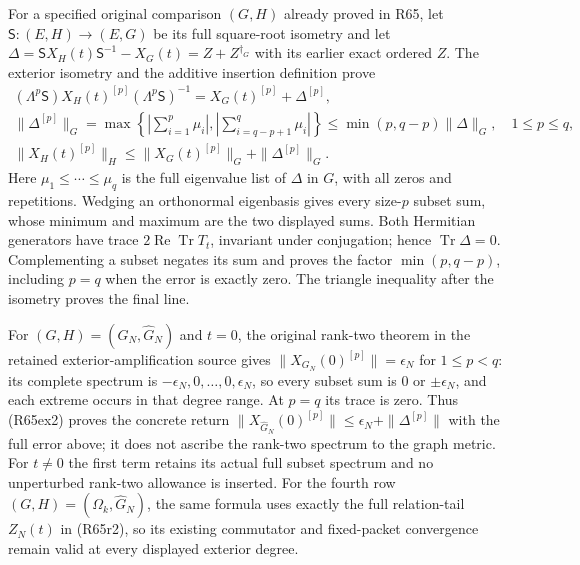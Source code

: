 For a specified original comparison $(G,H)$ already proved in
R65, let $\mathsf S:(E,H)\to(E,G)$ be its full square-root
isometry and let
$\Delta=\mathsf S X_H(t)\mathsf S^{-1}-X_G(t)
=Z+Z^{\dagger_G}$ with its earlier exact ordered $Z$.
The exterior isometry and the additive insertion definition prove
\[
\begin{gathered}
 (\Lambda^p\mathsf S)X_H(t)^{[p]}(\Lambda^p\mathsf S)^{-1}
       =X_G(t)^{[p]}+\Delta^{[p]},\\
 \|\Delta^{[p]}\|_G=
 \max\left\{\left|\sum_{i=1}^{p}\mu_i\right|,
             \left|\sum_{i=q-p+1}^{q}\mu_i\right|\right\}
       \leq\min(p,q-p)\|\Delta\|_G,\quad 1\leq p\leq q,\\
 \|X_H(t)^{[p]}\|_H
       \leq\|X_G(t)^{[p]}\|_G+\|\Delta^{[p]}\|_G .
\end{gathered}\tag{R65ex2}
\]
Here $\mu_1\leq\cdots\leq\mu_q$ is the full eigenvalue list
of $\Delta$ in $G$, with all zeros and repetitions. Wedging
an orthonormal eigenbasis gives every size-$p$ subset sum,
whose minimum and maximum are the two displayed sums.
Both Hermitian generators have trace $2\operatorname{Re}
\operatorname{Tr}T_t$, invariant under conjugation; hence
$\operatorname{Tr}\Delta=0$. Complementing a subset negates
its sum and proves the factor $\min(p,q-p)$, including
$p=q$ when the error is exactly zero. The triangle inequality
after the isometry proves the final line.

For $(G,H)=(G_N,\widehat G_N)$ and $t=0$, the original
rank-two theorem in the retained exterior-amplification source
gives $\|X_{G_N}(0)^{[p]}\|=\epsilon_N$ for $1\leq p<q$:
its complete spectrum is $-\epsilon_N,0,\ldots,0,\epsilon_N$,
so every subset sum is $0$ or $\pm\epsilon_N$, and each
extreme occurs in that degree range. At $p=q$ its trace is
zero. Thus (R65ex2) proves the concrete return
$\|X_{\widehat G_N}(0)^{[p]}\|
\leq\epsilon_N+\|\Delta^{[p]}\|$ with the full error above;
it does not ascribe the rank-two spectrum to the graph metric.
For $t\ne0$ the first term retains its actual full subset
spectrum and no unperturbed rank-two allowance is inserted.
For the fourth row $(G,H)=(\Omega_k,\widehat G_N)$, the
same formula uses exactly the full relation-tail $Z_N(t)$
in (R65r2), so its existing commutator and fixed-packet
convergence remain valid at every displayed exterior degree.

